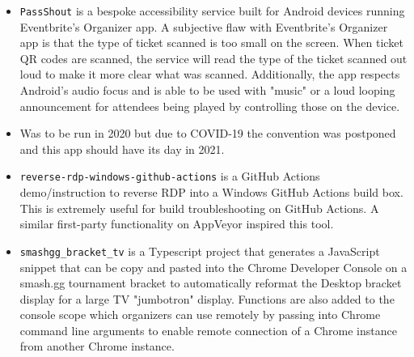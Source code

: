 \documentclass[10pt,letter,ragged2e]{altacv}
\begin{document}
\begin{paracol}{2}
\divider


\begin{itemize}
\item \texttt{PassShout} is a bespoke accessibility service built for Android devices running Eventbrite's Organizer app. A subjective flaw with Eventbrite's Organizer app is that the type of ticket scanned is too small on the screen. When ticket QR codes are scanned, the service will read the type of the ticket scanned out loud to make it more clear what was scanned. Additionally, the app respects Android's audio focus and is able to be used with "music" or a loud looping announcement for attendees being played by controlling those on the device. 
\item Was to be run in 2020 but due to COVID-19 the convention was postponed and this app should have its day in 2021.
\end{itemize}

\divider


\begin{itemize}
\item \texttt{reverse-rdp-windows-github-actions} is a GitHub Actions demo/instruction to reverse RDP into a Windows GitHub Actions build box. This is extremely useful for build troubleshooting on GitHub Actions. A similar first-party functionality on AppVeyor inspired this tool.
\end{itemize}

\divider


\begin{itemize}
\item \texttt{smashgg\_bracket\_tv} is a Typescript project that generates a JavaScript snippet that can be copy and pasted into the Chrome Developer Console on a smash.gg tournament bracket to automatically reformat the Desktop bracket display for a large TV "jumbotron" display. Functions are also added to the console scope which organizers can use remotely by passing into Chrome command line arguments to enable remote connection of a Chrome instance from another Chrome instance.
\end{itemize}


\end{paracol}
\end{document}
